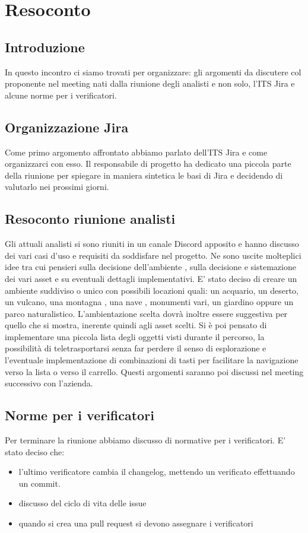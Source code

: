 \section{Resoconto}
\subsection{Introduzione}
In questo incontro ci siamo trovati per organizzare: gli argomenti da discutere col proponente nel meeting nati dalla riunione degli analisti e non solo, l'ITS Jira e alcune norme per i verificatori.   

\subsection{Organizzazione Jira}
Come primo argomento affrontato abbiamo parlato dell'ITS Jira e come organizzarci con esso. Il responsabile di progetto ha dedicato una piccola parte della riunione per spiegare in maniera sintetica le basi di Jira e decidendo di valutarlo nei prossimi giorni.

\subsection{Resoconto riunione analisti}
Gli attuali analisti si sono riuniti in un canale Discord apposito e hanno discusso dei vari casi d'uso e requisiti da soddisfare nel progetto.
Ne sono uscite molteplici idee tra cui pensieri sulla decisione dell'ambiente , sulla decisione e sistemazione dei vari asset e su eventuali dettagli implementativi. E' stato deciso di creare un ambiente suddiviso o unico con possibili locazioni quali: un acquario, un deserto, un vulcano, una montagna , una nave , monumenti vari, un giardino oppure un parco naturalistico. L'ambientazione scelta dovrà inoltre essere suggestiva per quello che si mostra, inerente quindi agli asset scelti.
Si è poi pensato di implementare una piccola lista degli oggetti visti durante il percorso, la possibilità di teletrasportarsi senza far perdere il senso di esplorazione e l'eventuale implementazione di combinazioni di tasti per facilitare la navigazione verso la lista o verso il carrello.  
Questi argomenti saranno poi discussi nel meeting successivo con l'azienda.

\subsection{Norme per i verificatori}
Per terminare la riunione abbiamo discusso di normative per i verificatori. E' stato deciso che:
\begin{itemize}
	\item l'ultimo verificatore cambia il changelog, mettendo un verificato effettuando un commit.
	\item discusso del ciclo di vita delle issue
	\item quando si crea una pull request si devono assegnare i verificatori
\end{itemize} 
 

